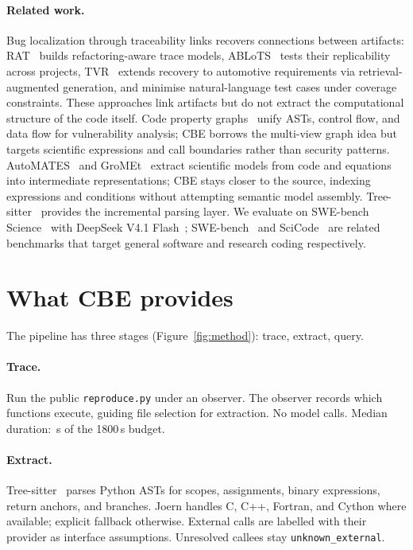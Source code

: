 \documentclass[11pt,a4paper,twocolumn]{article}
\begin{document}
\paragraph{Related work.}
Bug localization through traceability links recovers connections between artifacts: RAT~\citep{niu2023rat} builds refactoring-aware trace models, ABLoTS~\citep{niu2023ablots} tests their replicability across projects, TVR~\citep{niu2025tvr} extends recovery to automotive requirements via retrieval-augmented generation, and \citet{pan2026coverage} minimise natural-language test cases under coverage constraints. These approaches link artifacts but do not extract the computational structure of the code itself. Code property graphs~\citep{yamaguchi2014cpg} unify ASTs, control flow, and data flow for vulnerability analysis; CBE borrows the multi-view graph idea but targets scientific expressions and call boundaries rather than security patterns. AutoMATES~\citep{pyarelal2020automates} and GroMEt~\citep{skema2024gromet} extract scientific models from code and equations into intermediate representations; CBE stays closer to the source, indexing expressions and conditions without attempting semantic model assembly. Tree-sitter~\citep{treesitter2024} provides the incremental parsing layer. We evaluate on SWE-bench Science~\citep{xu2026science} with DeepSeek V4.1 Flash~\citep{deepseek2026}; SWE-bench~\citep{jimenez2024swebench} and SciCode~\citep{tian2024scicode} are related benchmarks that target general software and research coding respectively.

\section{What CBE provides}
\label{sec:method}

The pipeline has three stages (Figure~\ref{fig:method}): trace, extract, query.

\paragraph{Trace.}
Run the public \texttt{reproduce.py} under an observer. The observer records which functions execute, guiding file selection for extraction. No model calls. Median duration: \MedianPreparation{}\,s of the 1800\,s budget.

\paragraph{Extract.}
Tree-sitter~\citep{treesitter2024} parses Python ASTs for scopes, assignments, binary expressions, return anchors, and branches. Joern handles C, C++, Fortran, and Cython where available; explicit fallback otherwise. External calls are labelled with their provider as interface assumptions. Unresolved callees stay \texttt{unknown\_external}.
\end{document}
